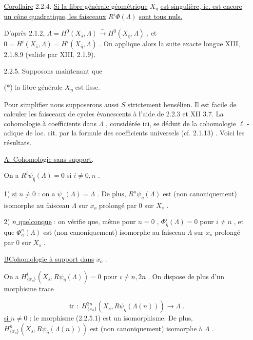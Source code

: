 \underline{Corollaire} 2.2.4. \underline{Si la fibre générale géométrique} $X_{\bar{\eta}}$ \underline{est singulière, ie. est encore un cône quadratique, les faisceaux} $R^i\Phi(\Lambda)$ \underline{sont tous nuls.}

D'après 2.1.2, $\Lambda = H^0(X_{\bar{s}},\Lambda) \stackrel{\sim}{\longrightarrow} H^0(X_{\bar{\eta}},\Lambda)$ , et $0 = H^i(X_{\bar{s}},\Lambda) = H^i(X_{\bar{\eta}},\Lambda)$ . On applique alors la suite exacte longue XIII, 2.1.8.9 (valide par XIII, 2.1.9).

2.2.5. Supposons maintenant que

($*$) la fibre générale $X_\eta$ est lisse.

Pour simplifier  nous supposerons aussi $S$ strictement hensélien. Il est facile de calculer les faisceaux de cycles évanescents à l'aide de 2.2.3 et XII 3.7. La cohomologie à coefficients dans $\Lambda$ , considérée ici, se déduit de la cohomologie $\ell$ - adique de loc. cit. par la formule des coefficients universels (cf. 2.1.13) . Voici les résultats.

\underline{A. Cohomologie sans support,}

On a $R^i\psi_{\bar\eta}(\Lambda) = 0$ si $i \neq 0,n$ .



1) \underline{si $n \neq 0$} : on a $\psi_{\overline{\eta}}(\Lambda) = \Lambda$ .    De plus, $R^n\psi_{\overline{\eta}}(\Lambda)$ est (non canoniquement) isomorphe au faisceau $\Lambda$ sur $x_o$ prolongé par $0$ sur $X_s$ .

2) \underline{$n$ quelconque} : on vérifie que, même pour $n = 0$ , $\Phi^i_{\overline{\eta}}(\Lambda) = 0$ pour $i \neq n$ , et que $\Phi^n_{\overline{\eta}}(\Lambda)$ est (non canoniquement) isomorphe au faisceau $\Lambda$ sur $x_o$ prolongé par $0$ sur $X_s$ .


\underline{B\quad Cohomologie à support dans} $x_o$ .

On a $H^i_{\{x_o\}}(X_s,R\psi_{\overline{\eta}}(\Lambda)) = 0$ pour $i \neq n,2n$ . On dispose de plus d'un morphisme trace

\begin{equation}\tag{2.2.5.1}
\mathrm{tr} \; : \; H^{2n}_{\{x_o\}}(X_s,R\psi_{\overline{\eta}}(\Lambda(n))) \longrightarrow \Lambda \;.
\end{equation}
\underline{si $n \neq 0$} : le morphisme (2.2.5.1) est un isomorphisme. De plus, $H^n_{\{x_o\}}(X_s,R\psi_{\overline{\eta}}(\Lambda(n)))$ est (non canoniquement) isomorphe à $\Lambda$ .

